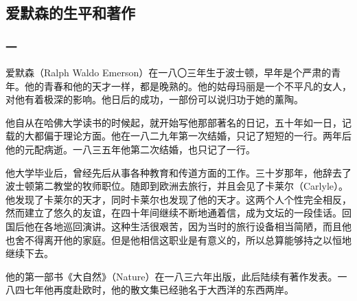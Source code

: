 \subsection{爱默森的生平和著作}


\subsubsection*{一}
\par 爱默森（Ralph Waldo Emerson）在一八〇三年生于波士顿，早年是个严肃的青年。他的青春和他的天才一样，都是晚熟的。他的姑母玛丽是一个不平凡的女人，对他有着极深的影响。他日后的成功，一部份可以说归功于她的薰陶。
\par 他自从在哈佛大学读书的时候起，就开始写他那部著名的日记，五十年如一日，记载的大都偏于理论方面。他在一八二九年第一次结婚，只记了短短的一行。两年后他的元配病逝。一八三五年他第二次结婚，也只记了一行。
\par 他大学毕业后，曾经先后从事各种教育和传道方面的工作。三十岁那年，他辞去了波士顿第二教堂的牧师职位。随即到欧洲去旅行，并且会见了卡莱尔（Carlyle）。他发现了卡莱尔的天才，同时卡莱尔也发现了他的天才。这两个人个性完全相反，然而建立了悠久的友谊，在四十年间继续不断地通着信，成为文坛的一段佳话。回国后他在各地巡回演讲。这种生活很艰苦，因为当时的旅行设备相当简陋，而且他也舍不得离开他的家庭。但是他相信这职业是有意义的，所以总算能够持之以恒地继续下去。
\par 他的第一部书《大自然》（Nature）在一八三六年出版，此后陆续有著作发表。一八四七年他再度赴欧时，他的散文集已经驰名于大西洋的东西两岸。
